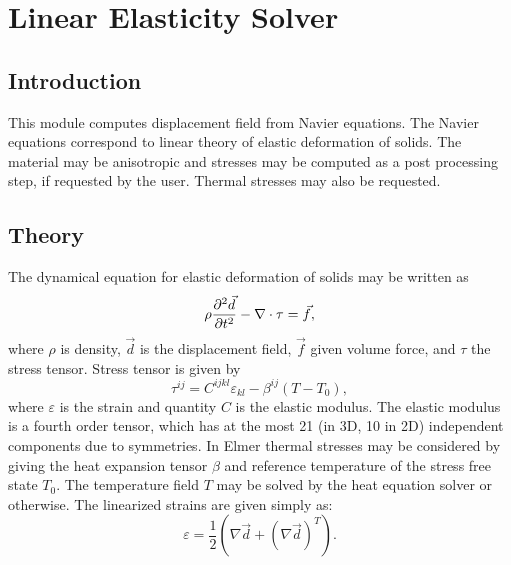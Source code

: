 \chapter{Linear Elasticity Solver}


\section{Introduction}

This module computes displacement field from Navier equations. The Navier equations
correspond to linear theory of elastic deformation of solids. The material may
be anisotropic and stresses may be computed as a post processing step, if
requested by the user. Thermal stresses may also be requested.

\section{Theory}

The dynamical equation for elastic deformation of solids may be written as
\begin{equation}
\rho\frac{\partial^2 \Vec{d}}{\partial t^2} - \nabla\cdot {\bf \tau} = \Vec{f},
\end{equation}
where $\rho$ is density, $\Vec{d}$ is the displacement field, $\Vec{f}$ given volume force, and
$\tau$ the stress tensor.
Stress tensor is given by
\begin{equation}
\tau^{ij} = C^{ijkl}\varepsilon_{kl} - \beta^{ij}(T-T_0),
\end{equation}
where $\varepsilon$ is the strain and quantity $C$ is the elastic modulus.
The elastic modulus is a fourth order tensor, which has at the most 21 (in 3D,
10 in 2D) independent components due to symmetries.
In Elmer thermal stresses may be considered by giving
the heat expansion tensor $\beta$ and reference temperature of the stress
free state $T_0$. The temperature field
$T$ may be solved by the heat equation solver or otherwise.
The linearized strains are given simply as:
\begin{equation}
\varepsilon = \frac{1}{2}(\nabla{\Vec{d}} + (\nabla{\Vec{d}})^T).
\end{equation}


